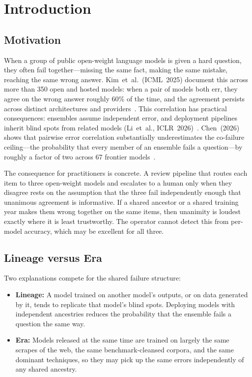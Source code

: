 \documentclass[journal]{IEEEtran}
\begin{document}
\section{Introduction}

\subsection{Motivation}

When a group of public open-weight language models is given a hard question, they often fail together---missing the same fact, making the same mistake, reaching the same wrong answer. Kim~et~al.~(ICML~2025) document this across more than 350 open and hosted models: when a pair of models both err, they agree on the wrong answer roughly 60\% of the time, and the agreement persists across distinct architectures and providers~\cite{kim2025}. This correlation has practical consequences: ensembles assume independent error, and deployment pipelines inherit blind spots from related models (Li~et~al., ICLR~2026)~\cite{li2026}. Chen~(2026) shows that pairwise error correlation substantially underestimates the co-failure ceiling---the probability that every member of an ensemble fails a question---by roughly a factor of two across 67 frontier models~\cite{chen2026}.

The consequence for practitioners is concrete. A review pipeline that routes each item to three open-weight models and escalates to a human only when they disagree rests on the assumption that the three fail independently enough that unanimous agreement is informative. If a shared ancestor or a shared training year makes them wrong together on the same items, then unanimity is loudest exactly where it is least trustworthy. The operator cannot detect this from per-model accuracy, which may be excellent for all three.

\subsection{Lineage versus Era}

Two explanations compete for the shared failure structure:
\begin{itemize}
\item \textbf{Lineage:} A model trained on another model's outputs, or on data generated by it, tends to replicate that model's blind spots. Deploying models with independent ancestries reduces the probability that the ensemble fails a question the same way.
\item \textbf{Era:} Models released at the same time are trained on largely the same scrapes of the web, the same benchmark-cleansed corpora, and the same dominant techniques, so they may pick up the same errors independently of any shared ancestry.
\end{itemize}
\end{document}
